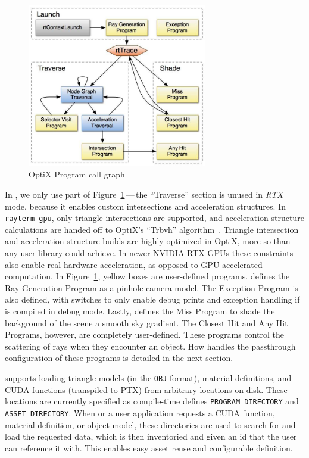 \vspace{0.3em}
\begin{figure}[htb]
  \centering
  \includegraphics[width=0.7\textwidth]{resources/optix_trace}
  \caption{OptiX Program call graph}
\label{fig:rayterm-gpu_optix_trace}
\end{figure}

In \name{}, we only use part of Figure~\ref{fig:rayterm-gpu_optix_trace}\,---\,the ``Traverse'' section is unused in {\it RTX\/} mode, because it enables custom intersections and acceleration structures.
In \texttt{rayterm-gpu}, only triangle intersections are supported, and acceleration structure calculations are handed off to OptiX's ``Trbvh'' algorithm~\cite{karras2013fast}.
Triangle intersection and acceleration structure builds are highly optimized in OptiX, more so than any user library could achieve.
In newer NVIDIA RTX GPUs these constraints also enable real hardware acceleration, as opposed to GPU accelerated computation.
In Figure~\ref{fig:rayterm-gpu_optix_trace}, yellow boxes are user-defined programs.
 \name{} defines the Ray Generation Program as a pinhole camera model.
The Exception Program is also defined, with switches to only enable debug prints and exception handling if \name{} is compiled in debug mode.
Lastly, \name{} defines the Miss Program to shade the background of the scene a smooth sky gradient.
The Closest Hit and Any Hit Programs, however, are completely user-defined.
These programs control the scattering of rays when they encounter an object.
How \name{} handles the passthrough configuration of these programs is detailed in the next section.

 \name{} supports loading triangle models (in the \texttt{OBJ} format), material definitions, and CUDA functions (transpiled to PTX) from arbitrary locations on disk.
These locations are currently specified as compile-time defines \texttt{PROGRAM\_DIRECTORY} and \texttt{ASSET\_DIRECTORY}.
When \name{} or a user application requests a CUDA function, material definition, or object model, these directories are used to search for and load the requested data, which is then inventoried and given an id that the user can reference it with.
This enables easy asset reuse and configurable definition.


